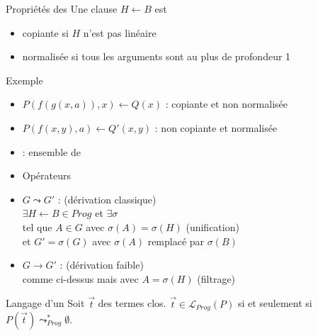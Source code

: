 \begin{frame}{\csclause}
  \begin{block}{Propriétés des \csclauses}
    Une clause $H \leftarrow B$ est
    \pause
    \begin{itemize}[<+->]
    \item copiante si $H$ n'est pas linéaire
    \item normalisée si tous les arguments sont au plus de profondeur 1
    \end{itemize}
  \end{block}
  \begin{exampleblock}{Exemple}
    \begin{itemize}
     \item $P(f(g(x,a)),x) \leftarrow Q(x)$ : copiante et non normalisée
     \item $P(f(x,y),a) \leftarrow Q'(x,y)$ : non copiante et normalisée
    \end{itemize}
  \end{exampleblock}
\end{frame}

\begin{frame}{\csprogramme}
  \begin{itemize}[<+->]
  \item \csprogramme : ensemble de \csclauses
  \item Opérateurs
  \end{itemize}
  \begin{block}{}
    \begin{itemize}[<+->]
    \item $G \leadsto G'$ : (dérivation classique) \\
      $\exists H \leftarrow B \in Prog$ et $\exists \sigma$ \\
      tel que $A \in G$ avec $\sigma(A) = \sigma(H)$ (unification)\\
      et $G' = \sigma(G)$ avec $\sigma(A)$ remplacé par $\sigma(B)$
    \item $G \rightarrow G'$ : (dérivation faible) \\
      comme ci-dessus mais avec $A = \sigma(H)$ (filtrage)
    \end{itemize}
  \end{block}
  \begin{block}{Langage d'un \csprogramme}
    Soit $\vec{t}$ des termes clos.
    $\vec{t} \in \mathcal{L}_{Prog}(P)$ si et seulement si $P(\vec{t}) \leadsto^*_{Prog} \emptyset$.
  \end{block}
\end{frame}

